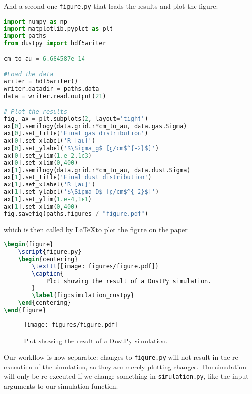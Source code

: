 \documentclass{aa}
\begin{document}
And a second one \texttt{figure.py} that loads the results and plot the figure:

\begin{lstlisting}[language=python, caption=figure.py]
import numpy as np
import matplotlib.pyplot as plt
import paths
from dustpy import hdf5writer

cm_to_au = 6.684587e-14

#Load the data
writer = hdf5writer()
writer.datadir = paths.data
data = writer.read.output(21)

# Plot the results
fig, ax = plt.subplots(2, layout='tight')
ax[0].semilogy(data.grid.r*cm_to_au, data.gas.Sigma)
ax[0].set_title('Final gas distribution')
ax[0].set_xlabel('R [au]')
ax[0].set_ylabel('$\Sigma_g$ [g/cm$^{-2}$]')
ax[0].set_ylim(1.e-2,1e3)
ax[0].set_xlim(0,400)
ax[1].semilogy(data.grid.r*cm_to_au, data.dust.Sigma)
ax[1].set_title('Final dust distribution')
ax[1].set_xlabel('R [au]')
ax[1].set_ylabel('$\Sigma_D$ [g/cm$^{-2}$]')
ax[1].set_ylim(1.e-4,1e1)
ax[1].set_xlim(0,400)
fig.savefig(paths.figures / "figure.pdf")
\end{lstlisting}

which is then called by \LaTeX to plot the figure on the paper

\begin{lstlisting}[language=TeX]
\begin{figure}
    \script{figure.py}
    \begin{centering}
        \texttt{[image: figures/figure.pdf]}
        \caption{
            Plot showing the result of a DustPy simulation.
        }
        \label{fig:simulation_dustpy}
    \end{centering}
\end{figure}
\end{lstlisting}

\begin{figure}
    \begin{centering}
        \texttt{[image: figures/figure.pdf]}
        \caption{
            Plot showing the result of a DustPy simulation.
        }
        \label{fig:simulation_dustpy}
    \end{centering}
\end{figure}

Our workflow is now separable: changes to \texttt{figure.py} will not result in the re-execution of the simulation, as they are merely plotting changes.
The simulation will only be re-executed if we change something in \texttt{simulation.py}, like the input arguments to our simulation function.
\end{document}
